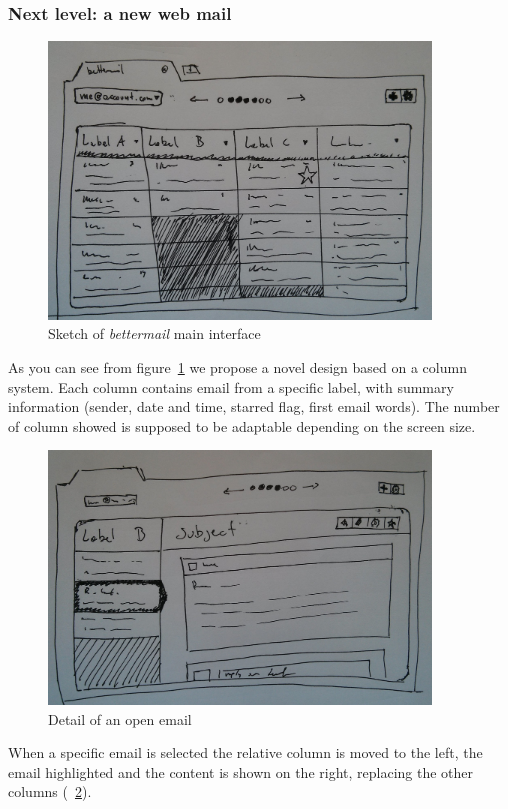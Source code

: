 \documentclass[a4paper,12pt]{report}
\begin{document}
\subsubsection{Next level: a new web mail}

\begin{figure}[H]
  \centering
  \includegraphics[width=4in]{new}
  \caption{Sketch of \emph{bettermail} main interface}
  \label{fig:new1}
\end{figure}
As you can see from figure~\ref{fig:new1} we propose a novel design based on a column system. 
Each column contains email from a specific label, with summary information (sender, date and time, starred flag, first email words). The number of column showed is supposed to be adaptable depending on the screen size. 


\begin{figure}[H]
  \centering
  \includegraphics[width=4in]{new_2_cols}
  \caption{Detail of an open email}
  \label{fig:new2}
\end{figure}

When a specific email is selected the relative column is moved to the left, the email highlighted and the content is shown on the right, replacing the other columns (~\ref{fig:new2}).
\end{document}
